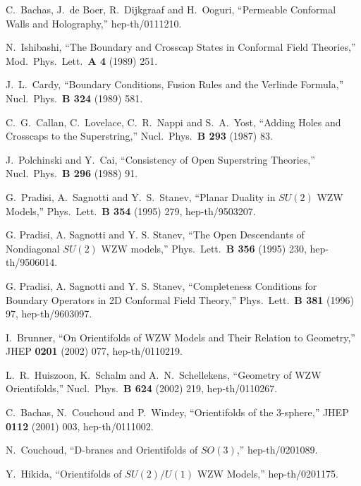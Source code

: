 \documentclass[a4paper,12pt]{article}
\begin{document}
\begin{thebibliography}{99}
C.~Bachas, J.~de Boer, R.~Dijkgraaf and H.~Ooguri,
``Permeable Conformal Walls and Holography,'' hep-th/0111210.

N.~Ishibashi,
``The Boundary and Crosscap States in Conformal Field Theories,''
Mod.\ Phys.\ Lett.\ {\bf A 4} (1989) 251.

J.~L.~Cardy,
``Boundary Conditions, Fusion Rules and the Verlinde Formula,''
Nucl.\ Phys.\ {\bf B 324} (1989) 581.

C.~G.~Callan, C.~Lovelace, C.~R.~Nappi and S.~A.~Yost,
``Adding Holes and Crosscaps to the Superstring,''
Nucl.\ Phys.\ {\bf B 293} (1987) 83.

J.~Polchinski and Y.~Cai,
``Consistency of Open Superstring Theories,''
Nucl.\ Phys.\  {\bf B 296} (1988) 91.

G.~Pradisi, A.~Sagnotti and Y.~S.~Stanev,
``Planar Duality in $SU(2)$ WZW Models,''
Phys.\ Lett.\ {\bf B 354} (1995) 279, hep-th/9503207.

 G. Pradisi, A. Sagnotti and Y. S. Stanev, ``The Open Descendants of
	Nondiagonal $SU(2)$ WZW models,'' Phys.\ Lett.\ {\bf B 356}
	(1995) 230, hep-th/9506014. 

 G. Pradisi, A. Sagnotti and Y. S. Stanev, ``Completeness Conditions for
	Boundary Operators in 2D Conformal Field Theory,'' Phys.\ Lett.\
	{\bf B 381} (1996) 97, hep-th/9603097. 

I.~Brunner,
``On Orientifolds of WZW Models and Their Relation to Geometry,''
JHEP {\bf 0201} (2002) 077, hep-th/0110219.


L.~R.~Huiszoon, K.~Schalm and A.~N.~Schellekens,
``Geometry of WZW Orientifolds,''
Nucl.\ Phys.\ {\bf B 624} (2002) 219, hep-th/0110267.

C.~Bachas, N.~Couchoud and P.~Windey,
``Orientifolds of the 3-sphere,''
JHEP {\bf 0112} (2001) 003, hep-th/0111002.

N.~Couchoud,
``D-branes and Orientifolds of $SO(3)$,''
        hep-th/0201089.

Y.~Hikida,
``Orientifolds of $SU(2)/U(1)$ WZW Models,'' hep-th/0201175.


\end{thebibliography}
\end{document}
